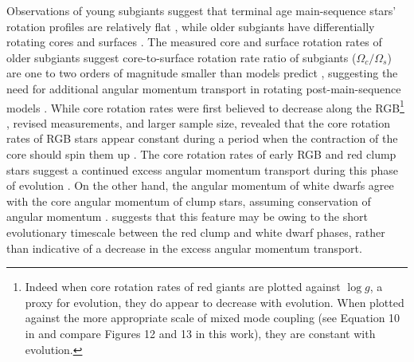Observations of young subgiants suggest that terminal age main-sequence stars' rotation profiles are relatively flat \citep{deheuvels_seismic_2020}, while older subgiants have differentially rotating cores and surfaces \citep{deheuvels_seismic_2014}.
The measured core and surface rotation rates of older subgiants suggest core-to-surface rotation rate ratio of subgiants ($\Omega_c / \Omega_s$) are one to two orders of magnitude smaller than models predict \citep{deheuvels_seismic_2014,spada_angular_2016, moyano_asteroseismology_2022}, suggesting the need for additional angular momentum transport in rotating post-main-sequence models \citep{fuller_asteroseismology_2015,spada_angular_2016,ouazzani_gamma_2018, eggenberger_asteroseismology_2019}.
While core rotation rates were first believed to decrease along the RGB\footnote{Indeed when core rotation rates of red giants are plotted against $\log{g}$, a proxy for evolution, they do appear to decrease with evolution. When plotted against the more appropriate scale of mixed mode coupling (see Equation 10 in \citet{gehan_core_2018} and compare Figures 12 and 13 in this work), they are constant with evolution.} \citep{mosser_spin_2012}, revised measurements, and larger sample size, revealed that the core rotation rates of RGB stars appear constant during a period when the contraction of the core should spin them up \citep{mosser_spin_2012,gehan_core_2018,moyano_asteroseismology_2022}.
The core rotation rates of early RGB and red clump stars suggest a continued excess angular momentum transport during this phase of evolution \citep{cantiello_angular_2014,moyano_asteroseismology_2022}.
On the other hand, the angular momentum of white dwarfs agree with the core angular momentum of clump stars, assuming conservation of angular momentum \citep{cantiello_angular_2014, den_hartogh_constraining_2019}.
\citet{cantiello_angular_2014} suggests that this feature may be owing to the short evolutionary timescale between the red clump and white dwarf phases, rather than indicative of a decrease in the excess angular momentum transport.

